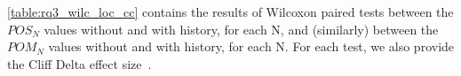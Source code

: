\autoref{table:rq3_wilc_loc_cc} contains the results of Wilcoxon paired tests between the $POS_N$ values without and with history, for each N, and (similarly) between the $POM_N$ values without and with history, for each N. For each test, we also provide the Cliff Delta effect size~\cite{Romano:2006}.%











